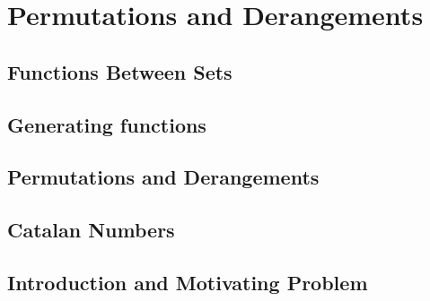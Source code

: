 \documentclass{article}
\begin{document}
\section{Permutations and Derangements}
\begingroup
  \renewcommand{\section}{\subsection}
  
\endgroup


\section{Functions Between Sets}
\begingroup
  \let\maketitle\relax
  
\endgroup

\section{Generating functions}
\section{Permutations and Derangements}
\begingroup
  \renewcommand{\section}{\subsection}
  
\endgroup





\section{Catalan Numbers}
\subsection{Introduction and Motivating Problem}
\end{document}
